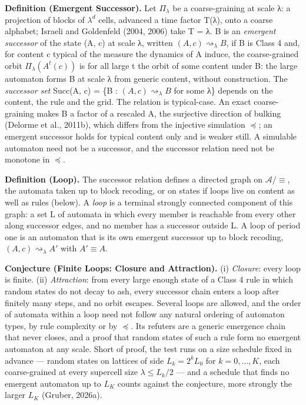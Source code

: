 \documentclass[
]{article}
\begin{document}
\textbf{Definition (Emergent Successor).} Let \(\Pi_\lambda\) be a
coarse-graining at scale λ: a projection of blocks of \(\lambda^d\)
cells, advanced a time factor T(λ), onto a coarse alphabet; Israeli and
Goldenfeld (2004, 2006) take T = λ. B is an \emph{emergent successor} of
the state (A, c) at scale λ, written
\((A, c) \rightsquigarrow_\lambda B\), if B is Class 4 and, for content
c typical of the measure the dynamics of A induce, the coarse-grained
orbit \(\Pi_\lambda(A^t(c))\) is for all large t the orbit of some
content under B: the large automaton forms B at scale λ from generic
content, without construction. The \emph{successor set} Succ(A, c) = \{B
: \((A, c) \rightsquigarrow_\lambda B\) for some λ\} depends on the
content, the rule and the grid. The relation is typical-case. An exact
coarse-graining makes B a factor of a rescaled A, the surjective
direction of bulking (Delorme et al., 2011b), which differs from the
injective simulation \(\preccurlyeq\); an emergent successor holds for
typical content only and is weaker still. A simulable automaton need not
be a successor, and the successor relation need not be monotone in
\(\preccurlyeq\).

\textbf{Definition (Loop).} The successor relation defines a directed
graph on \(\mathcal{A}/{\equiv}\), the automata taken up to block
recoding, or on states if loops live on content as well as rules
(below). A \emph{loop} is a terminal strongly connected component of
this graph: a set L of automata in which every member is reachable from
every other along successor edges, and no member has a successor outside
L. A loop of period one is an automaton that is its own emergent
successor up to block recoding, \((A, c) \rightsquigarrow_\lambda A'\)
with \(A' \equiv A\).

\textbf{Conjecture (Finite Loops: Closure and Attraction).} (i)
\emph{Closure}: every loop is finite. (ii) \emph{Attraction}: from every
large enough state of a Class 4 rule in which random states do not decay
to ash, every successor chain enters a loop after finitely many steps,
and no orbit escapes. Several loops are allowed, and the order of
automata within a loop need not follow any natural ordering of automaton
types, by rule complexity or by \(\preccurlyeq\). Its refuters are a
generic emergence chain that never closes, and a proof that random
states of such a rule form no emergent automaton at any scale. Short of
proof, the test runs on a size schedule fixed in advance --- random
states on lattices of side \(L_k = 2^k L_0\) for \(k = 0, \dots, K\),
each coarse-grained at every supercell size \(\lambda \le L_k / 2\) ---
and a schedule that finds no emergent automaton up to \(L_K\) counts
against the conjecture, more strongly the larger \(L_K\) (Gruber,
2026a).
\end{document}
